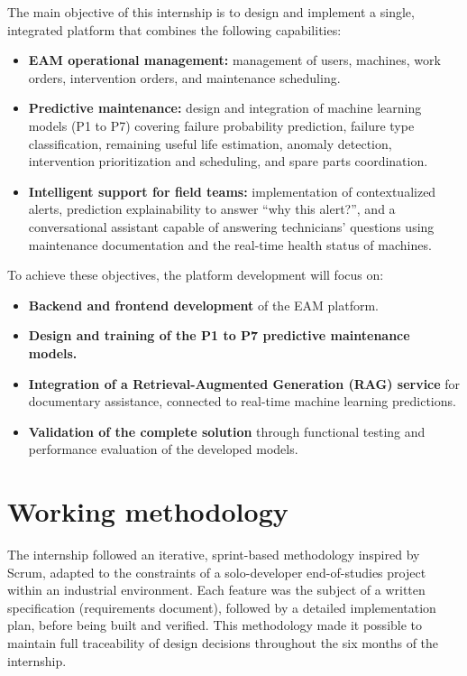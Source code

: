 The main objective of this internship is to design and implement a single, integrated platform that combines the following capabilities:

\begin{itemize}
\item \textbf{EAM operational management:} management of users, machines, work orders, intervention orders, and maintenance scheduling.
\item \textbf{Predictive maintenance:} design and integration of machine learning models (P1 to P7) covering failure probability prediction, failure type classification, remaining useful life estimation, anomaly detection, intervention prioritization and scheduling, and spare parts coordination.
\item \textbf{Intelligent support for field teams:} implementation of contextualized alerts, prediction explainability to answer ``why this alert?'', and a conversational assistant capable of answering technicians' questions using maintenance documentation and the real-time health status of machines.
\end{itemize}

To achieve these objectives, the platform development will focus on:

\begin{itemize}
\item \textbf{Backend and frontend development} of the EAM platform.
\item \textbf{Design and training of the P1 to P7 predictive maintenance models.}
\item \textbf{Integration of a Retrieval-Augmented Generation (RAG) service} for documentary assistance, connected to real-time machine learning predictions.
\item \textbf{Validation of the complete solution} through functional testing and performance evaluation of the developed models.
\end{itemize}

\section{Working methodology}
\label{sec:methodology}

The internship followed an iterative, sprint-based methodology inspired by Scrum, adapted to the constraints of a solo-developer end-of-studies project within an industrial environment. Each feature was the subject of a written specification (requirements document), followed by a detailed implementation plan, before being built and verified. This methodology made it possible to maintain full traceability of design decisions throughout the six months of the internship.

